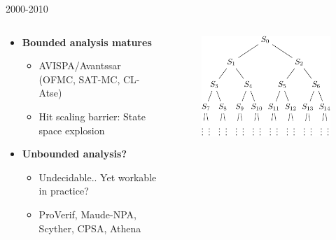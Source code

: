 \documentclass[11pt,aspectratio=169]{beamer}
\begin{document}
\begin{frame}[fragile]{2000-2010}
    \begin{columns}
        \begin{column}{0.5\textwidth}
            \begin{itemize}
                \item \textbf{Bounded analysis matures}
                \begin{itemize}
                    \item AVISPA/Avantssar (OFMC, SAT-MC, CL-Atse)
                    \item Hit scaling barrier: State space explosion
                \end{itemize}
                \item \textbf{Unbounded analysis?}
                \begin{itemize}
                    \item Undecidable.. Yet workable in practice?
                    \item ProVerif, Maude-NPA, Scyther, CPSA, Athena
                \end{itemize}
            \end{itemize}
        \end{column}
        \begin{column}{0.5\textwidth}
            \begin{figure}
                \includegraphics[width=.8\textwidth]
                    {./figures/lecture_0/state_space_explosion}
            \end{figure}
        \end{column}
    \end{columns}
\end{frame}
\end{document}
